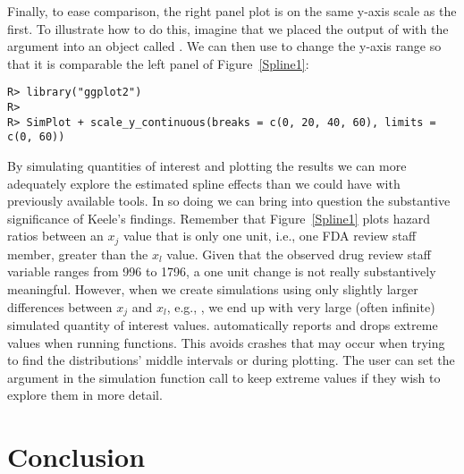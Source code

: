 \documentclass[nojss]{jss}\usepackage[]{graphicx}\usepackage[]{color}
\makeatletter
\newenvironment{kframe}{%
 \def\at@end@of@kframe{}%
 \ifinner\ifhmode%
  \def\at@end@of@kframe{\end{minipage}}%
  \begin{minipage}{\columnwidth}%
 \fi\fi%
 \def\FrameCommand##1{\hskip\@totalleftmargin \hskip-\fboxsep
 \colorbox{shadecolor}{##1}\hskip-\fboxsep
     \hskip-\linewidth \hskip-\@totalleftmargin \hskip\columnwidth}%
 \MakeFramed {\advance\hsize-\width
   \@totalleftmargin\z@ \linewidth\hsize
   \@setminipage}}%
 {\par\unskip\endMakeFramed%
 \at@end@of@kframe}
\newenvironment{knitrout}{}{} %
\makeatother
\begin{document}
Finally, to ease comparison, the right panel plot is on the same y-axis scale as the first. To illustrate how to do this, imagine that we placed the output of  with the argument  into an object called . We can then use  to change the y-axis range so that it is comparable the left panel of Figure~\ref{Spline1}:

\begin{knitrout}
\color{fgcolor}\begin{kframe}
\begin{verbatim}
R> library("ggplot2")
R> 
R> SimPlot + scale_y_continuous(breaks = c(0, 20, 40, 60), limits = c(0, 60))
\end{verbatim}
\end{kframe}
\end{knitrout}

By simulating quantities of interest and plotting the results we can more adequately explore the estimated spline effects than we could have with previously available tools. In so doing we can bring into question the substantive significance of Keele's \citeyearpar{Keele2010} findings. Remember that Figure~\ref{Spline1} plots hazard ratios between an $x_{j}$ value that is only one unit, i.e., one FDA review staff member, greater than the $x_{l}$ value. Given that the observed drug review staff variable  ranges from 996 to 1796, a one unit change is not really substantively meaningful. However, when we create simulations using only slightly larger differences between $x_{j}$ and $x_{l}$, e.g., , we end up with very large (often infinite) simulated quantity of interest values.  automatically reports and drops extreme values when running  functions. This avoids crashes that may occur when trying to find the distributions' middle intervals or during plotting. The user can set the argument  in the simulation function call to keep extreme values if they wish to explore them in more detail.

\section[Conclusion]{Conclusion}
\end{document}
